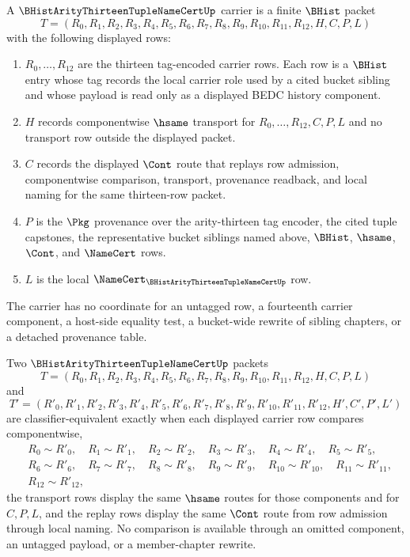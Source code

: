 \begin{definition}
\label{def:b-hist-arity13-tuple-name-cert-carrier}
A $\BHistArityThirteenTupleNameCertUp$ carrier is a finite $\BHist$ packet
$$
T=(R_0,R_1,R_2,R_3,R_4,R_5,R_6,R_7,R_8,R_9,R_{10},R_{11},R_{12},H,C,P,L)
$$
with the following displayed rows:
\begin{enumerate}
\item $R_0,\ldots,R_{12}$ are the thirteen tag-encoded carrier rows. Each row is a $\BHist$ entry whose tag records the local carrier role used by a cited bucket sibling and whose payload is read only as a displayed BEDC history component.
\item $H$ records componentwise $\hsame$ transport for $R_0,\ldots,R_{12},C,P,L$ and no transport row outside the displayed packet.
\item $C$ records the displayed $\Cont$ route that replays row admission, componentwise comparison, transport, provenance readback, and local naming for the same thirteen-row packet.
\item $P$ is the $\Pkg$ provenance over the arity-thirteen tag encoder, the cited tuple capstones, the representative bucket siblings named above, $\BHist$, $\hsame$, $\Cont$, and $\NameCert$ rows.
\item $L$ is the local $\NameCert_{\BHistArityThirteenTupleNameCertUp}$ row.
\end{enumerate}
The carrier has no coordinate for an untagged row, a fourteenth carrier component, a host-side equality test, a bucket-wide rewrite of sibling chapters, or a detached provenance table.
\end{definition}

\begin{definition}
\label{def:b-hist-arity13-tuple-name-cert-classifier}
Two $\BHistArityThirteenTupleNameCertUp$ packets
$$
T=(R_0,R_1,R_2,R_3,R_4,R_5,R_6,R_7,R_8,R_9,R_{10},R_{11},R_{12},H,C,P,L)
$$
and
$$
T'=(R'_0,R'_1,R'_2,R'_3,R'_4,R'_5,R'_6,R'_7,R'_8,R'_9,R'_{10},R'_{11},R'_{12},H',C',P',L')
$$
are classifier-equivalent exactly when each displayed carrier row compares componentwise,
$$
\begin{aligned}
&R_0 \sim R'_0,\quad R_1 \sim R'_1,\quad R_2 \sim R'_2,\quad R_3 \sim R'_3,\quad R_4 \sim R'_4,\quad R_5 \sim R'_5,\\
&R_6 \sim R'_6,\quad R_7 \sim R'_7,\quad R_8 \sim R'_8,\quad R_9 \sim R'_9,\quad R_{10} \sim R'_{10},\quad R_{11} \sim R'_{11},\\
&R_{12} \sim R'_{12},
\end{aligned}
$$
the transport rows display the same $\hsame$ routes for those components and for $C,P,L$, and the replay rows display the same $\Cont$ route from row admission through local naming. No comparison is available through an omitted component, an untagged payload, or a member-chapter rewrite.
\end{definition}

